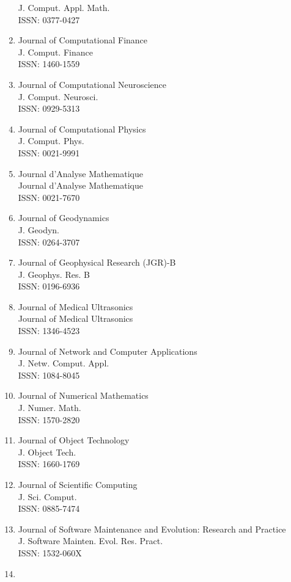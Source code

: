 \begin{enumerate}
 J. Comput. Appl. Math.\\
 ISSN: 0377-0427
\item
 Journal of Computational Finance\\
 J. Comput. Finance\\
 ISSN: 1460-1559
\item
 Journal of Computational Neuroscience\\
 J. Comput. Neurosci.\\
 ISSN: 0929-5313
\item
 Journal of Computational Physics\\
 J. Comput. Phys.\\
 ISSN: 0021-9991
\item
 Journal d'Analyse Mathematique\\
 Journal d'Analyse Mathematique\\
 ISSN: 0021-7670
\item
 Journal of Geodynamics\\
 J. Geodyn.\\
 ISSN: 0264-3707
\item
 Journal of Geophysical Research (JGR)-B\\
 J. Geophys. Res. B\\
 ISSN: 0196-6936
\item
 Journal of Medical Ultrasonics\\
 Journal of Medical Ultrasonics\\
 ISSN: 1346-4523
\item
 Journal of Network and Computer Applications\\
 J. Netw. Comput. Appl.\\
 ISSN: 1084-8045
\item
 Journal of Numerical Mathematics\\
 J. Numer. Math.\\
 ISSN: 1570-2820
\item
 Journal of Object Technology\\
 J. Object Tech.\\
 ISSN: 1660-1769
\item
 Journal of Scientific Computing\\
 J. Sci. Comput.\\
 ISSN: 0885-7474
\item
 Journal of Software Maintenance and Evolution: Research and Practice\\
 J. Software Mainten. Evol. Res. Pract.\\
 ISSN: 1532-060X
\item

\end{enumerate}
